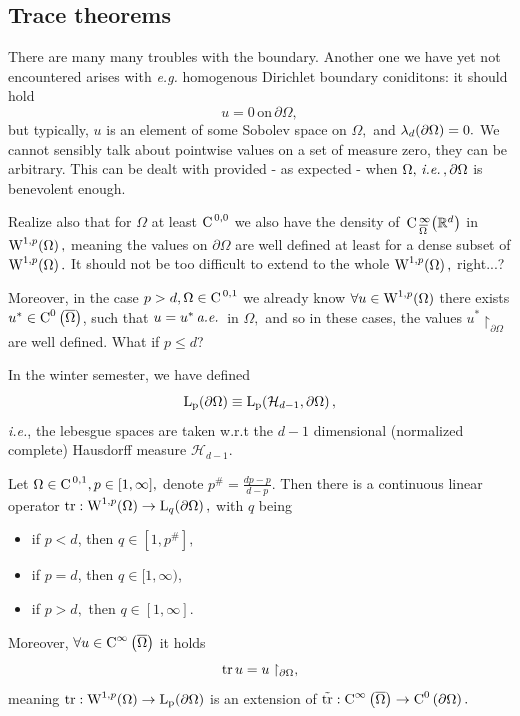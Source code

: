 \documentclass{article}
\begin{document}
\subsection{Trace theorems}
\label{sec:traces}

There are many many troubles with the boundary. Another one we have yet not encountered arises with \textit{e.g.} homogenous Dirichlet boundary coniditons: it should hold
\[
	u = 0 \, \text{on} \, \partial \Omega,
\]
but typically, $u$ is an element of some Sobolev space on $\Omega,$ and $\lambda_{d}\qty(\partial \Omega) = 0.$ We cannot sensibly talk about pointwise values on a set of measure zero, they can be arbitrary. This can be dealt with provided - as expected - when $\Omega, \, \text{\textit{i.e.}} \,, \partial \Omega$ is benevolent enough. 

Realize also that for $\Omega$ at least $\text{C}^{\!\,\, 0,0}$ we also have the density of $\, \text{C} \,^{\infty}_{\overline{\Omega}}\qty({\mathbb R}^{d})$ in $\WkpSet[1][p]{\Omega},$ meaning the values on $\partial \Omega$ are well defined at least for a dense subset of $\WkpSet[1][p]{\Omega}.$ It should not be too difficult to extend to the whole $\WkpSet[1][p]{\Omega},$ right...?

Moreover, in the case $p>d, \Omega \in \text{C}^{\!\,\, 0,1}$ we already know $\forall u \in \WkpSet[1][p]{\Omega}$ there exists $u^{*} \in \text{C}^{0}\!\,\left(\overline{\Omega} \right)$, such that $u = u^{*} \, \text{\textit{a.e.}} \,$ in $\Omega,$ and so in these cases, the values $u^{*}\restriction_{\partial \Omega}$ are well defined. What if $p \leq d$?

\begin{remark}
	In the winter semester, we have defined
	\[
		\LpSet{\partial \Omega} \equiv \LpSet{\mathcal{H}_{d-1}, \partial \Omega},
	\]
	\textit{i.e.}, the lebesgue spaces are taken w.r.t the $d-1$ dimensional (normalized complete) Hausdorff measure $\mathcal{H}_{d-1}.$
\end{remark}
\begin{theorem}
	Let $\Omega \in \text{C}^{\!\,\, 0,1}, p \in [1,\infty],$ denote $p^{\#} = \frac{dp-p}{d-p}.$ Then there is a continuous linear operator $\trace: \WkpSet[1][p]{\Omega} \to \LpSet[q]{\partial \Omega},$ with $q$ being

	\begin{itemize}
		\item if $p<d$, then $q \in [1, p^{\#}],$
		\item if $p=d$, then $q \in [1, \infty)$,
		\item if $p>d,$ then $q \in [1, \infty]$.
	\end{itemize}
	Moreover, $\forall u \in \text{C}^{\infty}\!\,\left(\overline{\Omega} \right)$ it holds
	\[
		\trace u = u\restriction_{\partial \Omega},
	\]
	meaning $\trace: \WkpSet[1][p]{\Omega} \to \LpSet{\partial \Omega}$ is an extension of $\tilde{\trace}: \CinfSet{\overline{\Omega}} \to \CkSet{0}{\partial \Omega}.$
\end{theorem}
\end{document}
